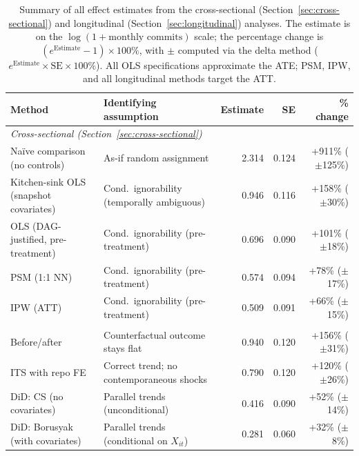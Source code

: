 \begin{table}[t]
\centering
\caption{Summary of all effect estimates from the cross-sectional (Section~\ref{sec:cross-sectional}) and longitudinal (Section~\ref{sec:longitudinal}) analyses.
The estimate is on the $\log(1 + \text{monthly commits})$ scale; the percentage change is $(e^{\text{Estimate}} - 1) \times 100\%$, with $\pm$ computed via the delta method ($e^{\text{Estimate}} \times \text{SE} \times 100\%$).
All OLS specifications approximate the ATE; PSM, IPW, and all longitudinal methods target the ATT.}
\label{tab:all-estimates}
\small
\begin{tabular}{llrrr}
\toprule
Method & Identifying assumption & Estimate & SE & \% change \\
\midrule
\multicolumn{5}{l}{\emph{Cross-sectional (Section~\ref{sec:cross-sectional})}} \\
Na\"ive comparison (no controls) & As-if random assignment & 2.314 & 0.124 & +911\% ($\pm$125\%) \\
Kitchen-sink OLS (snapshot covariates) & Cond.\ ignorability (temporally ambiguous) & 0.946 & 0.116 & +158\% ($\pm$30\%) \\
OLS (DAG-justified, pre-treatment) & Cond.\ ignorability (pre-treatment) & 0.696 & 0.090 & +101\% ($\pm$18\%) \\
PSM (1:1 NN) & Cond.\ ignorability (pre-treatment) & 0.574 & 0.094 & +78\% ($\pm$17\%) \\
IPW (ATT) & Cond.\ ignorability (pre-treatment) & 0.509 & 0.091 & +66\% ($\pm$15\%) \\
\addlinespace
\multicolumn{5}{l}{\emph{Longitudinal (Section~\ref{sec:longitudinal})}} \\
Before/after & Counterfactual outcome stays flat & 0.940 & 0.120 & +156\% ($\pm$31\%) \\
ITS with repo FE & Correct trend; no contemporaneous shocks & 0.790 & 0.120 & +120\% ($\pm$26\%) \\
DiD: CS (no covariates) & Parallel trends (unconditional) & 0.416 & 0.090 & +52\% ($\pm$14\%) \\
DiD: Borusyak (with covariates) & Parallel trends (conditional on $X_{it}$) & 0.281 & 0.060 & +32\% ($\pm$8\%) \\
\bottomrule
\end{tabular}
\end{table}

